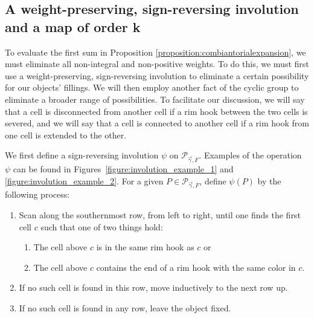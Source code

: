 \documentclass[a4paper,12pt]{amsart}
\theoremstyle{plain}
\theoremstyle{definition}
\theoremstyle{remark}
\begin{document}
\subsection{A weight-preserving, sign-reversing involution and a map of order k}

To evaluate the first sum in Proposition \ref{proposition:combiantorialexpansion}, we must eliminate all non-integral and non-positive weights. To do this, we must first use a weight-preserving, sign-reversing involution to eliminate a certain possibility for our objects' fillings. We will then employ another fact of the cyclic group to eliminate a broader range of possibilities. To facilitate our discussion, we will say that a cell is disconnected from another cell if a rim hook between the two cells is severed, and we will say that a cell is connected to another cell if a rim hook from one cell is extended to the other.

We first define a sign-reversing involution $\psi$ on $\mathcal{P}_{\vec{\gamma},F}$.
Examples of the operation $\psi$ can be found in Figures~\ref{figure:involution_example_1} and \ref{figure:involution_example_2}.
For a given $P \in \mathcal{P}_{\vec{\gamma},F}$, define $\psi(P)$
by the following process: 
\begin{enumerate}
\item Scan along the southernmost row, from left to right, until one finds the first cell $c$ such that one of two things hold:
\begin{enumerate}
\item The cell above $c$ is in the same rim hook as $c$ or
\item The cell above $c$ contains the end of a rim hook with the same color in $c$.
\end{enumerate}
\item If no such cell is found in this row, move inductively to the next row up. 
\item If no such cell is found in any row, leave the object fixed.
\end{enumerate}
\end{document}
